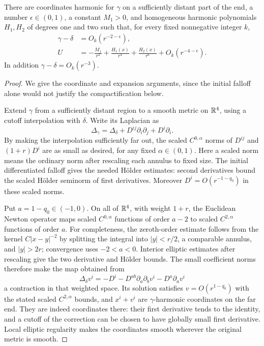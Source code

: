 \begin{lemma}\label{rig4:cla:asymptotics}
There are coordinates harmonic for $\gamma$ on a sufficiently distant
part of the end, a number $\epsilon\in(0,1)$, a constant $M_1>0$, and
homogeneous harmonic polynomials $H_1,H_2$ of degrees one and two such
that, for every fixed nonnegative integer $k$,
\begin{align}
 \gamma-\delta&=O_k(r^{-2-\epsilon}),\label{rig4:cla:gamma-decay}\\
 U&=-\frac{M_1}{r^2}
       +\frac{H_1(x)}{r^4}
       +\frac{H_2(x)}{r^6}
       +O_k(r^{-4-\epsilon}).\label{rig4:cla:U-expansion}
\end{align}
In addition $\gamma-\delta=O_k(r^{-3})$.
\end{lemma}

\begin{proof}
We give the coordinate and expansion arguments, since the initial
falloff alone would not justify the compactification below.

Extend $\gamma$ from a sufficiently distant region to a smooth metric
on $\mathbb R^4$, using a cutoff interpolation with $\delta$.  Write its
Laplacian as
\[
 \Delta_\gamma
 =\Delta_\delta+D^{ij}\partial_i\partial_j+D^i\partial_i.
\]
By making the interpolation sufficiently far out, the scaled
$C^{0,\alpha}$ norms of $D^{ij}$ and $(1+r)D^i$ are as small as desired,
for any fixed $\alpha\in(0,1)$.  Here a scaled norm means the ordinary
norm after rescaling each annulus to fixed size.  The initial
differentiated falloff gives the needed Hölder estimates: second
derivatives bound the scaled Hölder seminorm of first derivatives.
Moreover $D^i=O(r^{-1-q_0})$ in these scaled norms.

Put $a=1-q_0\in(-1,0)$.  On all of $\mathbb R^4$, with weight $1+r$, the
Euclidean Newton operator maps scaled $C^{0,\alpha}$ functions of order
$a-2$ to scaled $C^{2,\alpha}$ functions of order $a$.
For completeness, the zeroth-order estimate follows from the kernel
$C|x-y|^{-2}$ by splitting the integral into $|y|<r/2$, a comparable
annulus, and $|y|>2r$; convergence uses $-2<a<0$.  Interior elliptic
estimates after rescaling give the two derivative and Hölder bounds.
The small coefficient norms therefore make the map obtained from
\[
 \Delta_\delta v^i
 =-D^i-D^{ab}\partial_a\partial_b v^i-D^a\partial_a v^i
\]
a contraction in that weighted space.  Its solution satisfies
$v=O(r^{1-q_0})$ with the stated scaled $C^{2,\alpha}$ bounds, and
$x^i+v^i$ are $\gamma$-harmonic coordinates on the far end.
They are indeed coordinates there: their first derivative tends to
the identity, and a cutoff of the correction can be chosen to have
globally small first derivative.  Local elliptic regularity makes the
coordinates smooth wherever the original metric is smooth.


\end{proof}
